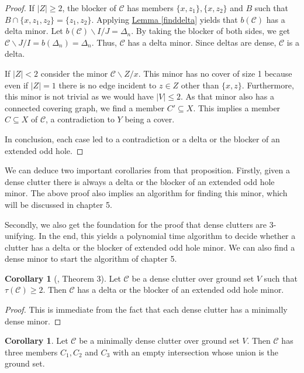 \documentclass[a4paper, 12pt]{scrbook}
\theoremstyle{definition}
\newtheorem{corollary}[theorem]{Corollary}
\begin{document}
\begin{proof}
       If $|Z|\geq 2$, the blocker of $\mathcal{C}$ has members $\{x,z_1\},\{x,z_2\}$ and $B$ such that $B \cap \{x,z_1,z_2\}=\{z_1,z_2\}$. Applying \hyperref[finddelta]{Lemma \ref*{finddelta}} yields that $b(\mathcal{C})$ has a delta minor. Let $b(\mathcal{C})\backslash I /J=\Delta_n$. By taking the blocker of both sides, we get $\mathcal{C} \backslash J / I = b(\Delta_n)=\Delta_n$.
       Thus, $\mathcal{C}$ has a delta minor. Since deltas are dense, $\mathcal{C}$ is a delta.

       If $|Z|<2$ consider the minor $\mathcal{C}\backslash Z /x$. This minor has no cover of size 1 because even if $|Z|=1$ there is no edge incident to $z \in Z$ other than $\{x,z\}$. Furthermore, this minor is not trivial as we would have $|V|\leq 2$.
       As that minor also has a connected covering graph, we find a member $C' \subseteq X$. This implies a member $C \subseteq X$ of $\mathcal{C}$, a contradiction to $Y$ being a cover.

       In conclusion, each case led to a contradiction or a delta or the blocker of an extended odd hole.
   \end{proof}

   We can deduce two important corollaries from that proposition. Firstly, given a dense clutter there is always a delta or the blocker of an extended odd hole minor. The above proof also implies an algorithm for finding this minor, which will be discussed in chapter 5.

   Secondly, we also get the foundation for the proof that dense clutters are 3-unifying. In the end, this yields a polynomial time algorithm to decide whether a clutter has a delta or the blocker of extended odd hole minor. We can also find a dense minor to start the algorithm of chapter 5.

   \begin{corollary}[\cite{deltas}, Theorem 3]\label{findminor}
       Let $\mathcal{C}$ be a dense clutter over ground set $V$ such that $\tau(\mathcal{C}) \geq 2$.
       Then $\mathcal{C}$ has a delta or the blocker of an extended odd hole minor.
   \end{corollary}

   \begin{proof}
       This is immediate from the fact that each dense clutter has a minimally dense minor.
   \end{proof}

   \begin{corollary}\label{threemember}
       Let $\mathcal{C}$ be a minimally dense clutter over ground set $V$.
       Then $\mathcal{C}$ has three members $C_1, C_2$ and $C_3$ with an empty intersection whose union is the ground set.
   \end{corollary}
\end{document}
